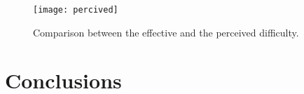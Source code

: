 \begin{figure}[tp]
 	\centering
	\texttt{[image: percived]}
	\caption{Comparison between the effective and the perceived difficulty.}
	\label{img:percived}		
\end{figure}


\section{Conclusions}

